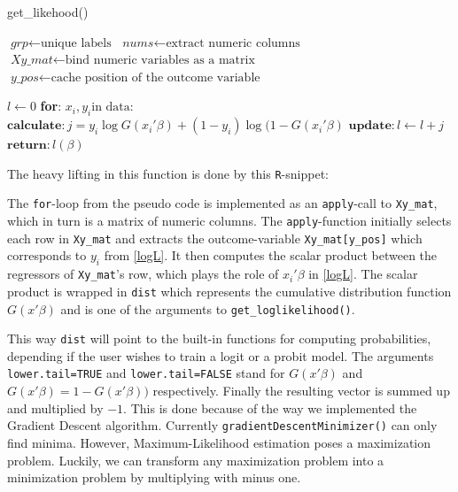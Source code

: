 \documentclass{article}
\begin{document}
\begin{algorithm}
\caption{get\_likehood()}\label{getllog}
\begin{algorithmic}[1]
\State $\textit{grp} \gets \text{unique labels}$
\State $\textit{nums} \gets \text{extract numeric columns}$
\State $\textit{Xy\_mat} \gets \text{bind numeric variables as a matrix}$
\State $\textit{y\_pos} \gets \text{cache position of the outcome variable}$
\EndProcedure

\State $\textit{l} \gets 0$
\State \textbf{for}: $x_i, y_i \text{in data}:$
\State \qquad $\textbf{calculate}: j = y_i \log G(x_i\prime \beta) +
               (1-y_i) \log (1-G(x_i\prime \beta)$
\State \qquad $\textbf{update}: l \gets l + j$
\State $\textbf{return}: l(\beta)$
\EndProcedure
\end{algorithmic}
\end{algorithm}

\newpage
The heavy lifting in this function is done by this \texttt{R}-snippet:


The \texttt{for}-loop from the pseudo code is implemented as an \texttt{apply}-call to \texttt{Xy\_mat}, which in turn is a matrix of numeric columns. The \texttt{apply}-function initially selects each row in \texttt{Xy\_mat} and extracts the outcome-variable \texttt{Xy\_mat[y\_pos]} which corresponds to $y_i$ from \ref{logL}. It then computes the scalar product between the regressors of \texttt{Xy\_mat}'s row, which plays the role of $x_i \prime \beta$ in \ref{logL}. The scalar product is wrapped in \texttt{dist} which represents the cumulative distribution function $G(x\prime\beta)$ and is one of the arguments to \texttt{get\_loglikelihood()}.



This way \texttt{dist} will point to the built-in functions for computing probabilities, depending if the user wishes to train a logit or a probit model. The arguments \texttt{lower.tail=TRUE} and \texttt{lower.tail=FALSE} stand for $G(x\prime \beta)$ and $G(x\prime \beta)= 1 - G(x\prime \beta))$ respectively. Finally the resulting vector is summed up and multiplied by $-1$. This is done because of the way we implemented the Gradient Descent algorithm. Currently \texttt{gradientDescentMinimizer()} can only find minima. However, Maximum-Likelihood estimation poses a maximization problem. Luckily, we can transform any maximization problem into a minimization problem by multiplying with minus one.
\end{document}
